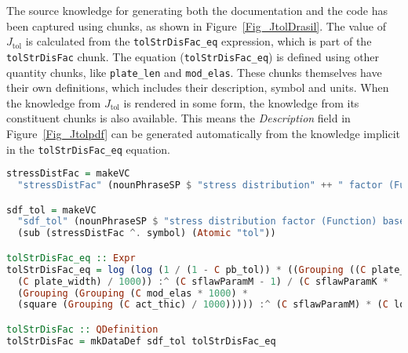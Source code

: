 \documentclass[sigconf]{acmart}
\newcommand{\authornt}[3]{\textcolor{#1}{[#3 ---#2]}}
\newcommand{\authornt}[3]{}
\newcommand{\jc}[1]{\authornt{magenta}{JC}{#1}} %
\newcommand{\jtol}{$J_{\mbox{tol}}$}
\newcommand{\inlHask}[1]{\lstinline[language=Haskell, columns=fullflexible,
  basicstyle=\ttfamily, showstringspaces=false, breaklines=true]{#1}}
\begin{document}
The source knowledge for generating both the documentation and the code has been
captured using chunks, as shown in Figure~\ref{Fig_JtolDrasil}. The value of
\jtol{} is calculated from the {\inlHask{tolStrDisFac_eq}} expression, which is
part of the {\inlHask{tolStrDisFac}} chunk.  The equation ({\inlHask{tolStrDisFac_eq}}) is
defined using other quantity chunks, like {\inlHask{plate_len}} and
{\inlHask{mod_elas}}.  These chunks themselves have their own definitions, which
includes their description, symbol and units.  When the knowledge from \jtol{} is
rendered in some form, the knowledge from its constituent chunks is also
available.  This means the \emph{Description} field in Figure~\ref{Fig_Jtolpdf} 
can be generated automatically from the knowledge implicit in the 
{\inlHask{tolStrDisFac_eq}} equation.

\begin{figure*}
\begin{lstlisting}[language=Haskell, frame=single, showstringspaces=false, basicstyle=\small] 
stressDistFac = makeVC 
  "stressDistFac" (nounPhraseSP $ "stress distribution" ++ " factor (Function)") cJ

sdf_tol = makeVC 
  "sdf_tol" (nounPhraseSP $ "stress distribution factor (Function) based on Pbtol") 
  (sub (stressDistFac ^. symbol) (Atomic "tol"))

tolStrDisFac_eq :: Expr
tolStrDisFac_eq = log (log (1 / (1 - C pb_tol)) * ((Grouping ((C plate_len / 1000) * 
  (C plate_width) / 1000)) :^ (C sflawParamM - 1) / (C sflawParamK * 
  (Grouping (Grouping (C mod_elas * 1000) * 
  (square (Grouping (C act_thic) / 1000))))) :^ (C sflawParamM) * (C loadDF))))

tolStrDisFac :: QDefinition
tolStrDisFac = mkDataDef sdf_tol tolStrDisFac_eq
\end{lstlisting}
\caption{Drasil (Haskell) code for \jtol{} Knowledge}
\label{Fig_JtolDrasil}
\end{figure*}
\end{document}
